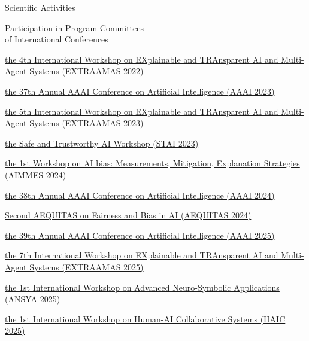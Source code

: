 \documentclass{resume} %
\begin{document}
\begin{rSection}{Scientific Activities}

        \begin{rSubsection2}{Participation in Program Committees\\ of International Conferences}
            \item \href{https://extraamas.ehealth.hevs.ch/archive.html#organizations-2022}{the 4th International Workshop on EXplainable and TRAnsparent AI and Multi-Agent Systems (EXTRAAMAS 2022)}
            \item \href{https://apice.unibo.it/xwiki/bin/view/Event/Aaai2023}{the 37th Annual AAAI Conference on Artificial Intelligence (AAAI 2023)}
            \item \href{https://apice.unibo.it/xwiki/bin/view/Event/Prima2023}{the 5th International Workshop on EXplainable and TRAnsparent AI and Multi-Agent Systems (EXTRAAMAS 2023)}
            \item \href{https://web.archive.org/web/20240225110652/https://www.stai.uk/stai-23-iclp}{the Safe and Trustworthy AI Workshop (STAI 2023)}
            \item \href{https://fairnesscluster.github.io/aimmes23.github.io/index.html}{the 1st Workshop on AI bias: Measurements, Mitigation, Explanation Strategies (AIMMES 2024)}
            \item \href{https://apice.unibo.it/xwiki/bin/view/Event/Aaai2024}{the 38th Annual AAAI Conference on Artificial Intelligence (AAAI 2024)}
            \item \href{https://aequitas-aod.github.io/aequitas-ecai24.github.io/pc-member.html}{Second AEQUITAS on Fairness and Bias in AI (AEQUITAS 2024)}
            \item \href{https://aaai.org/conference/aaai/aaai-25/}{the 39th Annual AAAI Conference on Artificial Intelligence (AAAI 2025)}
            \item \href{https://extraamas.ehealth.hevs.ch/index.html}{the 7th International Workshop on EXplainable and TRAnsparent AI and Multi-Agent Systems (EXTRAAMAS 2025)}
            \item \href{https://ansya-workshop.github.io/2025}{the 1st International Workshop on Advanced Neuro-Symbolic Applications (ANSYA 2025)}
            \item \href{https://haic-workshop.github.io/haic.github.io}{the 1st International Workshop on Human-AI Collaborative Systems (HAIC 2025)}
        \end{rSubsection2}


\end{rSection}
\end{document}

